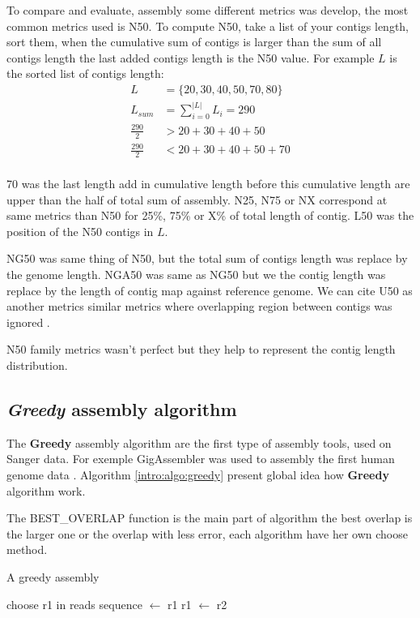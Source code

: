 \documentclass[./main.tex]{subfiles}
\begin{document}
To compare and evaluate, assembly some different metrics was develop, the most common metrics used is N50.
To compute N50, take a list of your contigs length, sort them, when the cumulative sum of contigs is larger than the sum of all contigs length the last added contigs length is the N50 value. For example $L$ is the sorted list of contigs length: 
\begin{equation}
\begin{aligned}
L &= \{20, 30, 40, 50, 70, 80\} \\
L_{sum} &= \sum\limits_{i=0}^{|L|} L_i = 290 \\
\frac{290}{2} &> 20 + 30 + 40 + 50 \\
\frac{290}{2} &< 20 + 30 + 40 + 50 + 70\\
\end{aligned}
\end{equation}

70 was the last length add in cumulative length before this cumulative length are upper than the half of total sum of assembly. N25, N75 or NX correspond at same metrics than N50 for 25\%, 75\% or X\% of total length of contig. L50 was the position of the N50 contigs in $L$.

NG50 was same thing of N50, but the total sum of contigs length was replace by the genome length. NGA50 was same as NG50 but we the contig length was replace by the length of contig map against reference genome. We can cite U50 as another metrics similar metrics where overlapping region between contigs was ignored \cite{U50}.

N50 family metrics wasn't perfect but they help to represent the contig length distribution.

\subsection{\textit{Greedy} assembly algorithm}

The \textbf{Greedy} assembly algorithm are the first type of assembly tools, used on Sanger data. For exemple GigAssembler was used to assembly the first human genome data \cite{GigAssembler}. Algorithm \ref{intro:algo:greedy} present global idea how \textbf{Greedy} algorithm work.

The BEST\_OVERLAP function is the main part of algorithm the best overlap is the larger one or the overlap with less error, each algorithm have her own choose method.

\begin{algorithm}[ht]
    \caption{A greedy assembly}
    \begin{algorithmic}[1]
        \State choose r1 in reads
        \State sequence $\leftarrow$ r1
            \State {}
            \State {}
            \State r1 $\leftarrow$ r2
        \EndWhile
    \EndFunction
    \end{algorithmic}
    \label{intro:algo:greedy}
\end{algorithm}
\end{document}
